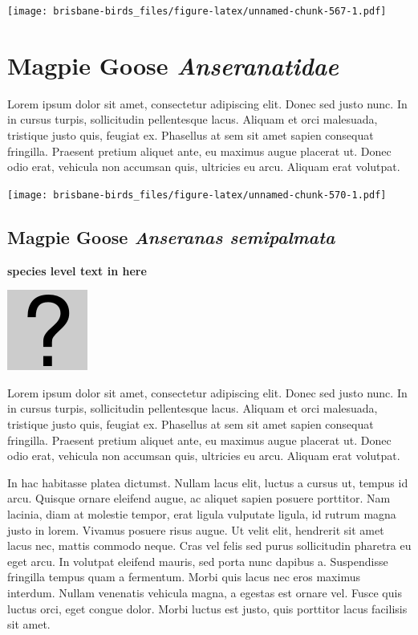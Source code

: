 \documentclass[]{book}
\let\origfigure\figure
\let\endorigfigure\endfigure
\renewenvironment{figure}[1][2] {
  \expandafter\origfigure\expandafter[H]
} {
  \endorigfigure
}
\begin{document}
\begin{figure}
\centering
\texttt{[image: brisbane-birds\_files/figure-latex/unnamed-chunk-567-1.pdf]}
\caption{\label{fig:unnamed-chunk-567}insert figure caption}
\end{figure}

\chapter{\texorpdfstring{Magpie Goose
\emph{Anseranatidae}}{Magpie Goose Anseranatidae}}\label{magpie-goose-anseranatidae}

Lorem ipsum dolor sit amet, consectetur adipiscing elit. Donec sed justo
nunc. In in cursus turpis, sollicitudin pellentesque lacus. Aliquam et
orci malesuada, tristique justo quis, feugiat ex. Phasellus at sem sit
amet sapien consequat fringilla. Praesent pretium aliquet ante, eu
maximus augue placerat ut. Donec odio erat, vehicula non accumsan quis,
ultricies eu arcu. Aliquam erat volutpat.

\texttt{[image: brisbane-birds\_files/figure-latex/unnamed-chunk-570-1.pdf]}

\section{\texorpdfstring{Magpie Goose \emph{Anseranas
semipalmata}}{Magpie Goose Anseranas semipalmata}}\label{magpie-goose-anseranas-semipalmata}

\textbf{species level text in here}

\begin{figure}
\centering
\includegraphics{assets/missing.png}
\caption{No image for species}
\end{figure}

Lorem ipsum dolor sit amet, consectetur adipiscing elit. Donec sed justo
nunc. In in cursus turpis, sollicitudin pellentesque lacus. Aliquam et
orci malesuada, tristique justo quis, feugiat ex. Phasellus at sem sit
amet sapien consequat fringilla. Praesent pretium aliquet ante, eu
maximus augue placerat ut. Donec odio erat, vehicula non accumsan quis,
ultricies eu arcu. Aliquam erat volutpat.

In hac habitasse platea dictumst. Nullam lacus elit, luctus a cursus ut,
tempus id arcu. Quisque ornare eleifend augue, ac aliquet sapien posuere
porttitor. Nam lacinia, diam at molestie tempor, erat ligula vulputate
ligula, id rutrum magna justo in lorem. Vivamus posuere risus augue. Ut
velit elit, hendrerit sit amet lacus nec, mattis commodo neque. Cras vel
felis sed purus sollicitudin pharetra eu eget arcu. In volutpat eleifend
mauris, sed porta nunc dapibus a. Suspendisse fringilla tempus quam a
fermentum. Morbi quis lacus nec eros maximus interdum. Nullam venenatis
vehicula magna, a egestas est ornare vel. Fusce quis luctus orci, eget
congue dolor. Morbi luctus est justo, quis porttitor lacus facilisis sit
amet.
\end{document}
